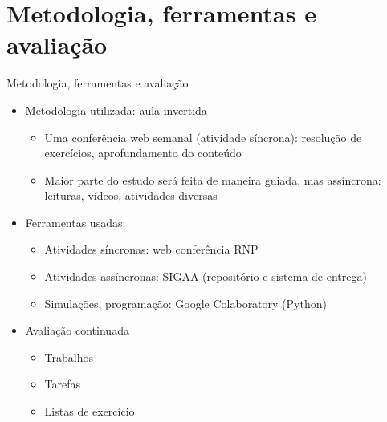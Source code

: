     \section[ slide = true]{Metodologia, ferramentas e avaliação}
      \begin{slide}[toc=]{Metodologia, ferramentas e avaliação}
         \begin{itemize}
	    \item Metodologia utilizada: aula invertida  
		    \begin{itemize}
			    \item Uma conferência web semanal (atividade síncrona): resolução de exercícios, aprofundamento do conteúdo
			    \item Maior parte do estudo será feita de maneira guiada, mas assíncrona: leituras, vídeos, atividades diversas
		    \end{itemize}
	    \item Ferramentas usadas:
		    \begin{itemize}
			    \item Atividades síncronas: web conferência RNP%
			    \item Atividades assíncronas: SIGAA (repositório e sistema de entrega)
			    \item Simulações, programação: Google Colaboratory (Python)
		    \end{itemize}

            \item Avaliação continuada
            \begin{itemize}
               \item Trabalhos 
               \item Tarefas 
	       \item Listas de exercício
	    \end{itemize}
	 \end{itemize}
      \end{slide}
      
